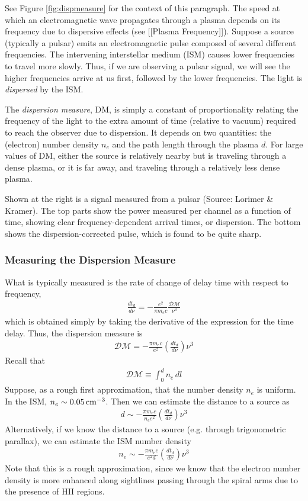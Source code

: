 \documentclass{article}
\begin{document}
See Figure \ref{fig:dispmeasure} for the context of this paragraph. The speed at which an electromagnetic wave propagates through a plasma depends on its frequency due to dispersive effects (see [[Plasma Frequency]]). Suppose a source (typically a pulsar) emits an electromagnetic pulse composed of several different frequencies. The intervening interstellar medium (ISM) causes lower frequencies to travel more slowly. Thus, if we are observing a pulsar signal, we will see the higher frequencies arrive at us first, followed by the lower frequencies. The light is \textit{dispersed} by the ISM. \par
The \textit{dispersion measure}, DM, is simply a constant of proportionality relating the frequency of the light to the extra amount of time (relative to vacuum) required to reach the observer due to dispersion. It depends on two quantities: the (electron) number density $n_e$ and the path length through the plasma $d$. For large values of DM, either the source is relatively nearby but is traveling through a dense plasma, or it is far away, and traveling through a relatively less dense plasma. \par
Shown at the right is a signal measured from a pulsar (Source: Lorimer \& Kramer). The top parts show the power measured per channel as a function of time, showing clear frequency-dependent arrival times, or dispersion. The bottom shows the dispersion-corrected pulse, which is found to be quite sharp.

\subsubsection{Measuring the Dispersion Measure}

What is typically measured is the rate of change of delay time with respect to frequency,
\begin{align}
\frac{dt_d}{d\nu}=-\frac{e^2}{\pi m_e c}\frac{\mathcal{DM}}{\nu^3}
\end{align}
which is obtained simply by taking the derivative of the expression for the time delay. Thus, the dispersion measure is
\begin{align}
\mathcal{DM}=-\frac{\pi m_e c}{e^2}\left(\frac{dt_d}{d\nu}\right)\nu^3
\end{align}
Recall that 
\begin{align}
\mathcal{DM}\equiv \int_0^d n_e\,dl
\end{align}
Suppose, as a rough first approximation, that the number density $n_e$ is uniform. In the ISM, $n_e\sim 0.05\,{\rm cm}^{-3}$. Then we can estimate the distance to a source as
\begin{align}
d\sim -\frac{\pi m_e c}{n_ee^2}\left(\frac{dt_d}{d\nu}\right)\nu^3
\end{align}
Alternatively, if we know the distance to a source (e.g. through trigonometric parallax), we can estimate the ISM number density
\begin{align}
n_e\sim -\frac{\pi m_e c}{e^2d}\left(\frac{dt_d}{d\nu}\right)\nu^3
\end{align}
Note that this is a rough approximation, since we know that the electron number density is more enhanced along sightlines passing through the spiral arms due to the presence of HII regions.
\end{document}

